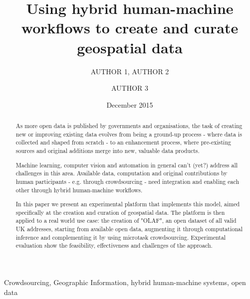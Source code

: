 \documentclass{llncs}
\title{Using hybrid human-machine workflows to create and curate geospatial data}
\author{AUTHOR 1\inst{1}, AUTHOR 2\inst{1} \and AUTHOR 3\inst{2}}
\institute{INSTITUTE 1 \email{EMAIL FOR AUTHOR 1} \and INSTITUTE 2}
\date{December 2015}
\begin{document}
\maketitle

\begin{abstract}
As more open data is published by governments and organisations, the task of creating new or improving existing data evolves from being a ground-up process - where data is collected and shaped from scratch - to an enhancement process, where pre-existing sources and original additions merge into new, valuable data products. 

Machine learning, computer vision and automation in general can't (yet?) address all challenges in this area. Available data, computation and original contributions by human participants - e.g. through crowdsourcing - need integration and enabling each other through hybrid human-machine workflows. 

In this paper we present an experimental platform that implements this model, aimed specifically at the creation and curation of geospatial data. The platform is then applied to a real world use case: the creation of "OLAF", an open dataset of all valid UK addresses, starting from available open data, augmenting it through computational inference and complementing it by using microtask crowdsourcing. Experimental evaluation show the feasibility, effectiveness and challenges of the approach.
\end{abstract}

\begin{keywords}
Crowdsourcing, Geographic Information, hybrid human-machine systems, open data 
\end{keywords}
\end{document}
